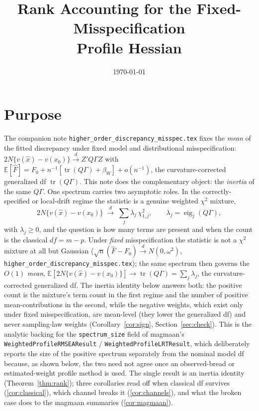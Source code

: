 \documentclass[11pt]{article}
\title{Rank Accounting for the Fixed-Misspecification\\Profile Hessian}
\author{}
\date{\today}
\newcommand{\E}{\mathbb{E}}
\newcommand{\tr}{\operatorname{tr}}
\newcommand{\dto}{\xrightarrow{d}}
\theoremstyle{plain}
\theoremstyle{remark}
\begin{document}
\maketitle

\section*{Purpose}

The companion note \texttt{higher\_order\_discrepancy\_misspec.tex} fixes the
\emph{mean} of the fitted discrepancy under fixed model and distributional
misspecification: $2N\{v(\hat x)-v(x_0)\}\dto Z'Q\Gamma Z$ with
$\E[\hat F]=F_0+n^{-1}[\tr(Q\Gamma)+\beta_W]+o(n^{-1})$, the curvature-corrected
generalized df $\tr(Q\Gamma)$. This note does the complementary object: the
\emph{inertia} of the same $Q\Gamma$. One spectrum carries two asymptotic roles.
In the correctly-specified or local-drift regime the statistic is a genuine
weighted $\chi^2$ mixture,
\begin{equation}\label{eq:mixture}
  2N\{v(\hat x)-v(x_0)\}\;\dto\;\sum_{j}\lambda_j\,\chi^2_{1,j},
  \qquad \lambda_j=\operatorname{eig}_j(Q\Gamma),
\end{equation}
with $\lambda_j\ge0$, and the question is how many terms are present and when the
count is the classical $df=m-p$. Under \emph{fixed} misspecification the statistic
is not a $\chi^2$ mixture at all but Gaussian ($\sqrt n(\hat F-F_0)\dto
N(0,\omega^2)$, \texttt{higher\_order\_discrepancy\_misspec.tex}); the same
spectrum then governs the $O(1)$ \emph{mean},
$\E[2N\{v(\hat x)-v(x_0)\}]\to\tr(Q\Gamma)=\sum_j\lambda_j$, the
curvature-corrected generalized df. The inertia identity below answers both: the
positive count is the mixture's term count in the first regime and the number of
positive mean-contributions in the second, while the negative weights, which
exist only under fixed misspecification, are mean-level (they lower the
generalized df) and never sampling-law weights
(Corollary~\ref{cor:sign}, Section~\ref{sec:check}). This is the analytic backing
for the
\texttt{spectrum\_size} field of magmaan's \texttt{WeightedProfileRMSEAResult}
/ \texttt{WeightedProfileLRTResult}, which deliberately reports the size of the
positive spectrum separately from the nominal model df because, as shown below,
the two need not agree once an observed-bread or estimated-weight profile method
is used. The single result is an inertia identity
(Theorem~\ref{thm:rank}); three corollaries read off when classical df survives
(\ref{cor:classical}), which channel breaks it (\ref{cor:channels}), and what
the broken case does to the magmaan summaries (\ref{cor:magmaan}).
\end{document}
